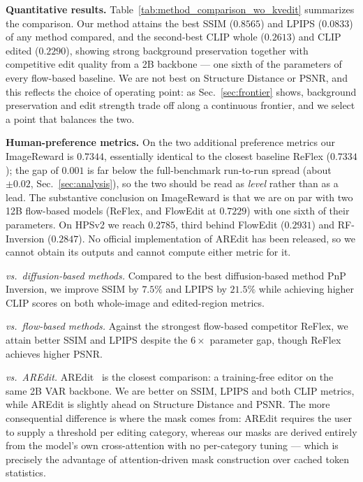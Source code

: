\noindent\textbf{Quantitative results.}
Table~\ref{tab:method_comparison_wo_kvedit} summarizes the comparison. Our
method attains the best SSIM ($0.8565$) and LPIPS ($0.0833$) of any method
compared, and the second-best CLIP whole ($0.2613$) and CLIP edited ($0.2290$),
showing strong background preservation together with competitive edit quality
from a 2B backbone --- one sixth of the parameters of every flow-based baseline.
We are not best on Structure Distance or PSNR, and this reflects the choice of
operating point: as Sec.~\ref{sec:frontier} shows, background preservation and
edit strength trade off along a continuous frontier, and we select a point that
balances the two.

\noindent\textbf{Human-preference metrics.}
On the two additional preference metrics our ImageReward is $0.7344$, essentially
identical to the closest baseline ReFlex ($0.7334$); the gap of $0.001$ is far
below the full-benchmark run-to-run spread (about $\pm 0.02$,
Sec.~\ref{sec:analysis}), so the two should be read as \textit{level} rather
than as a lead. The substantive conclusion on ImageReward is that we are on par
with two 12B flow-based models (ReFlex, and FlowEdit at $0.7229$) with one sixth
of their parameters. On HPSv2 we reach $0.2785$, third behind FlowEdit
($0.2931$) and RF-Inversion ($0.2847$). No official implementation of AREdit has
been released, so we cannot obtain its outputs and cannot compute either metric
for it.

\textit{vs.\ diffusion-based methods.}
Compared to the best diffusion-based method PnP Inversion, we improve SSIM by $7.5\%$ and LPIPS by $21.5\%$ while achieving higher CLIP scores on both whole-image and edited-region metrics.

\textit{vs.\ flow-based methods.}
Against the strongest flow-based competitor ReFlex, we attain better SSIM and
LPIPS despite the $6\times$ parameter gap, though ReFlex achieves higher PSNR.

\textit{vs.\ AREdit.}
AREdit~\cite{AREdit} is the closest comparison: a training-free editor on the same 2B VAR backbone. We are better on SSIM, LPIPS and both CLIP metrics, while AREdit is slightly ahead on Structure Distance and PSNR. The more consequential difference is where the mask comes from: AREdit requires the user to supply a threshold per editing category, whereas our masks are derived entirely from the model's own cross-attention with no per-category tuning --- which is precisely the advantage of attention-driven mask construction over cached token statistics.

